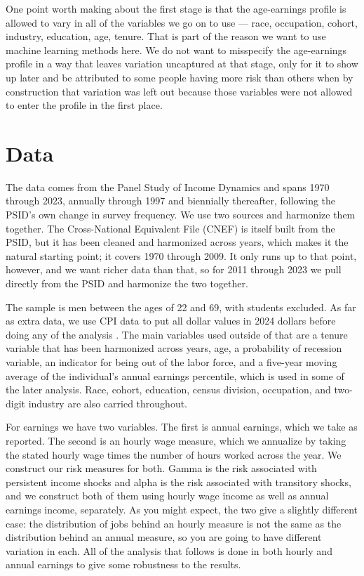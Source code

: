 \documentclass[12pt]{article}
\begin{document}
\begin{onehalfspace}
One point worth making about the first stage is that the age-earnings profile is allowed to vary in all of the variables we go on to use --- race, occupation, cohort, industry, education, age, tenure. That is part of the reason we want to use machine learning methods here. We do not want to misspecify the age-earnings profile in a way that leaves variation uncaptured at that stage, only for it to show up later and be attributed to some people having more risk than others when by construction that variation was left out because those variables were not allowed to enter the profile in the first place.


\section{Data}

The data comes from the Panel Study of Income Dynamics \cite{psid2023} and spans 1970 through 2023, annually through 1997 and biennially thereafter, following the PSID's own change in survey frequency. We use two sources and harmonize them together. The Cross-National Equivalent File (CNEF) is itself built from the PSID, but it has been cleaned and harmonized across years, which makes it the natural starting point; it covers 1970 through 2009. It only runs up to that point, however, and we want richer data than that, so for 2011 through 2023 we pull directly from the PSID and harmonize the two together.

The sample is men between the ages of 22 and 69, with students excluded. As far as extra data, we use CPI data to put all dollar values in 2024 dollars before doing any of the analysis \cite{cpi2017}. The main variables used outside of that are a tenure variable that has been harmonized across years, age, a probability of recession variable, an indicator for being out of the labor force, and a five-year moving average of the individual's annual earnings percentile, which is used in some of the later analysis. Race, cohort, education, census division, occupation, and two-digit industry are also carried throughout.

For earnings we have two variables. The first is annual earnings, which we take as reported. The second is an hourly wage measure, which we annualize by taking the stated hourly wage times the number of hours worked across the year. We construct our risk measures for both. Gamma is the risk associated with persistent income shocks and alpha is the risk associated with transitory shocks, and we construct both of them using hourly wage income as well as annual earnings income, separately. As you might expect, the two give a slightly different case: the distribution of jobs behind an hourly measure is not the same as the distribution behind an annual measure, so you are going to have different variation in each. All of the analysis that follows is done in both hourly and annual earnings to give some robustness to the results.


\end{onehalfspace}
\end{document}
